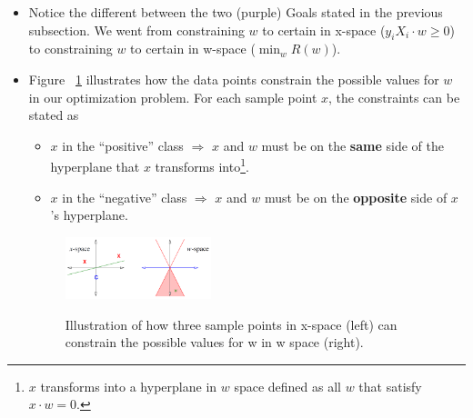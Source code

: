 \documentclass[12pt]{article}
\begin{document}
\subsubsection{}
\begin{itemize}
	\item Notice the different between the two (purple) Goals stated in the previous subsection. We went from constraining $w$ to certain  in x-space ($y_i X_i \cdot w \ge 0$) to constraining $w$ to certain  in w-space ($\min_w R(w)$).
	\item Figure ~\ref{XSpaceWSpace} illustrates how the data points constrain the possible values for $w$ in our optimization problem. For each sample point $x$, the constraints can be stated as
	\begin{itemize}
		\item $x$ in the ``positive'' class $\Rightarrow$ $x$ and $w$ must be on the \textbf{same} side of the hyperplane that $x$ transforms into\footnote{$x$ transforms into a hyperplane in $w$ space defined as all $w$ that satisfy $x \cdot w = 0$.}.
		\item $x$ in the ``negative'' class $\Rightarrow$ $x$ and $w$ must be on the \textbf{opposite} side of $x$'s hyperplane.
	\end{itemize}
	\begin{figure}[h!]
		\centering
		\includegraphics[width=0.4\textwidth]{XSpaceWSpace.PNG}
		\label{XSpaceWSpace}
		\caption{Illustration of how three sample points in x-space (left) can constrain the possible values for w in w space (right).}
	\end{figure}
\end{itemize}
\end{document}
